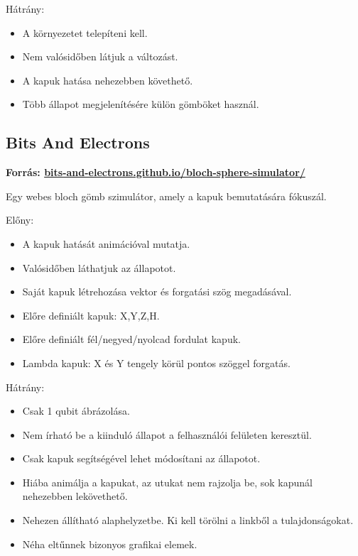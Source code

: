 \documentclass[fontsize=12pt,a4paper]{article}
\begin{document}
Hátrány:

\begin{itemize}
    \item A környezetet telepíteni kell.
    \item Nem valósidőben látjuk a változást.
    \item A kapuk hatása nehezebben követhető.
    \item Több állapot megjelenítésére külön gömböket használ.
\end{itemize}


\vspace{0.4cm}
\subsection{Bits And Electrons}
\textbf{Forrás: \href{https://bits-and-electrons.github.io/bloch-sphere-simulator/}{bits-and-electrons.github.io/bloch-sphere-simulator/}}

Egy webes bloch gömb szimulátor, amely a kapuk bemutatására fókuszál.

Előny:

\begin{itemize}
    \item A kapuk hatását animációval mutatja.
    \item Valósidőben láthatjuk az állapotot.
    \item Saját kapuk létrehozása vektor és forgatási szög megadásával.
    \item Előre definiált kapuk: X,Y,Z,H.
    \item Előre definiált fél/negyed/nyolcad fordulat kapuk.
    \item Lambda kapuk: X és Y tengely körül pontos szöggel forgatás.
\end{itemize}

Hátrány:

\begin{itemize}
    \item Csak 1 qubit ábrázolása.
    \item Nem írható be a kiinduló állapot a felhasználói felületen keresztül.
    \item Csak kapuk segítségével lehet módosítani az állapotot.
    \item Hiába animálja a kapukat, az utukat nem rajzolja be, sok kapunál nehezebben lekövethető.
    \item Nehezen állítható alaphelyzetbe. Ki kell törölni a linkből a tulajdonságokat.
    \item Néha eltűnnek bizonyos grafikai elemek.
\end{itemize}
\end{document}
